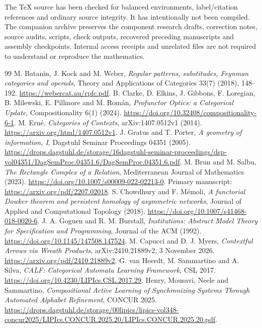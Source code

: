 \documentclass[11pt]{article}
\theoremstyle{definition}\newtheorem{definition}[theorem]{Definition}
\theoremstyle{remark}\newtheorem{remark}[theorem]{Remark}
\begin{document}
The TeX source has been checked for balanced environments, label/citation
references and ordinary source integrity. It has intentionally not been
compiled. The companion archive preserves the component research drafts,
correction notes, source audits, scripts, check outputs, recovered preceding
manuscripts and assembly checkpoints. Internal access receipts and unrelated
files are not required to understand or reproduce the mathematics.


\begin{thebibliography}{99}
 M. Batanin, J. Kock and M. Weber,
\emph{Regular patterns, substitudes, Feynman categories and operads},
Theory and Applications of Categories 33(7) (2018), 148--192.
\url{https://webercat.au/rpfc.pdf}.
 B. Clarke, D. Elkins, J. Gibbons, F. Loregian,
B. Milewski, E. Pillmore and M. Rom\'an,
\emph{Profunctor Optics: a Categorical Update}, Compositionality 6(1) (2024).
\url{https://doi.org/10.32408/compositionality-6-1}.
 M. Ern\'e, \emph{Categories of Contexts},
arXiv:1407.0512v1 (2014).
\url{https://arxiv.org/html/1407.0512v1}.
 J. Gratus and T. Porter, \emph{A geometry of information, I},
Dagstuhl Seminar Proceedings 04351 (2005).
\url{https://drops.dagstuhl.de/storage/16dagstuhl-seminar-proceedings/dsp-vol04351/DagSemProc.04351.6/DagSemProc.04351.6.pdf}.
 M. Brun and M. Salbu, \emph{The Rectangle Complex of a Relation},
Mediterranean Journal of Mathematics (2023).
\url{https://doi.org/10.1007/s00009-022-02213-0}.
Primary manuscript: \url{https://arxiv.org/pdf/2207.02018}.
 S. Chowdhury and F. M\'emoli,
\emph{A functorial Dowker theorem and persistent homology of asymmetric networks},
Journal of Applied and Computational Topology (2018).
\url{https://doi.org/10.1007/s41468-018-0020-6}.
 J. A. Goguen and R. M. Burstall,
\emph{Institutions: Abstract Model Theory for Specification and Programming},
Journal of the ACM (1992).
\url{https://doi.org/10.1145/147508.147524}.
 M. Capucci and D. J. Myers,
\emph{Contextful Arrows via Wreath Products}, arXiv:2410.21889v2,
3 November 2026.
\url{https://arxiv.org/pdf/2410.21889v2}.
 G. van Heerdt, M. Sammartino and A. Silva,
\emph{CALF: Categorical Automata Learning Framework}, CSL 2017.
\url{https://doi.org/10.4230/LIPIcs.CSL.2017.29}.
 Henry, Mousavi, Neele and Sammartino,
\emph{Compositional Active Learning of Synchronizing Systems Through
Automated Alphabet Refinement}, CONCUR 2025.
\url{https://drops.dagstuhl.de/storage/00lipics/lipics-vol348-concur2025/LIPIcs.CONCUR.2025.20/LIPIcs.CONCUR.2025.20.pdf}.

\end{thebibliography}
\end{document}

